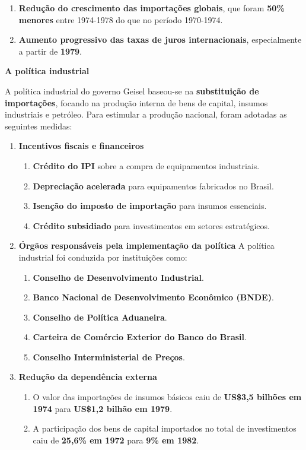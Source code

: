 \documentclass[a4paper,12pt]{article}[abntex2]
\begin{document}
\begin{enumerate}
    \item \textbf{Redução do crescimento das importações globais}, que foram \textbf{50\% menores} entre 1974-1978 do que no período 1970-1974.
    \item \textbf{Aumento progressivo das taxas de juros internacionais}, especialmente a partir de \textbf{1979}.
\end{enumerate}

\textbf{A política industrial}

A política industrial do governo Geisel baseou-se na \textbf{substituição de importações}, focando na produção interna de bens de capital, insumos industriais e petróleo. Para estimular a produção nacional, foram adotadas as seguintes medidas:

\begin{enumerate}
    \item \textbf{Incentivos fiscais e financeiros}  
    \begin{enumerate}
        \item \textbf{Crédito do IPI} sobre a compra de equipamentos industriais.
        \item \textbf{Depreciação acelerada} para equipamentos fabricados no Brasil.
        \item \textbf{Isenção do imposto de importação} para insumos essenciais.
        \item \textbf{Crédito subsidiado} para investimentos em setores estratégicos.
    \end{enumerate}

    \item \textbf{Órgãos responsáveis pela implementação da política}  
    A política industrial foi conduzida por instituições como:
    \begin{enumerate}
        \item \textbf{Conselho de Desenvolvimento Industrial}.
        \item \textbf{Banco Nacional de Desenvolvimento Econômico (BNDE)}.
        \item \textbf{Conselho de Política Aduaneira}.
        \item \textbf{Carteira de Comércio Exterior do Banco do Brasil}.
        \item \textbf{Conselho Interministerial de Preços}.
    \end{enumerate}

    \item \textbf{Redução da dependência externa}  
    \begin{enumerate}
        \item O valor das importações de insumos básicos caiu de \textbf{US\$3,5 bilhões em 1974} para \textbf{US\$1,2 bilhão em 1979}.
        \item A participação dos bens de capital importados no total de investimentos caiu de \textbf{25,6\% em 1972} para \textbf{9\% em 1982}.
    \end{enumerate}


\end{enumerate}
\end{document}

